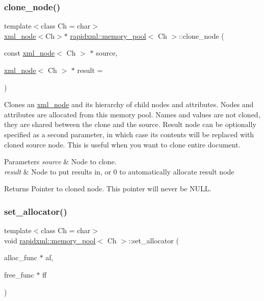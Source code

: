 \subsubsection{\texorpdfstring{clone\+\_\+node()}{clone\_node()}}
{\footnotesize\ttfamily template$<$class Ch  = char$>$ \\
\mbox{\hyperlink{classrapidxml_1_1xml__node}{xml\+\_\+node}}$<$Ch$>$$\ast$ \mbox{\hyperlink{classrapidxml_1_1memory__pool}{rapidxml\+::memory\+\_\+pool}}$<$ Ch $>$\+::clone\+\_\+node (\begin{DoxyParamCaption}\item[{const \mbox{\hyperlink{classrapidxml_1_1xml__node}{xml\+\_\+node}}$<$ Ch $>$ $\ast$}]{source,  }\item[{\mbox{\hyperlink{classrapidxml_1_1xml__node}{xml\+\_\+node}}$<$ Ch $>$ $\ast$}]{result = {} }\end{DoxyParamCaption})\hspace{0.3cm}{\ttfamily [inline]}}

Clones an \mbox{\hyperlink{classrapidxml_1_1xml__node}{xml\+\_\+node}} and its hierarchy of child nodes and attributes. Nodes and attributes are allocated from this memory pool. Names and values are not cloned, they are shared between the clone and the source. Result node can be optionally specified as a second parameter, in which case its contents will be replaced with cloned source node. This is useful when you want to clone entire document. 
\begin{DoxyParams}{Parameters}
{\em source} & Node to clone. \\
\hline
{\em result} & Node to put results in, or 0 to automatically allocate result node \\
\hline
\end{DoxyParams}
\begin{DoxyReturn}{Returns}
Pointer to cloned node. This pointer will never be N\+U\+LL. 
\end{DoxyReturn}
\mbox{\label{classrapidxml_1_1memory__pool_a84d3d8d2cdfc00501e1dcf26d889ae03}} 
\subsubsection{\texorpdfstring{set\+\_\+allocator()}{set\_allocator()}}
{\footnotesize\ttfamily template$<$class Ch  = char$>$ \\
void \mbox{\hyperlink{classrapidxml_1_1memory__pool}{rapidxml\+::memory\+\_\+pool}}$<$ Ch $>$\+::set\+\_\+allocator (\begin{DoxyParamCaption}\item[{alloc\+\_\+func $\ast$}]{af,  }\item[{free\+\_\+func $\ast$}]{ff }\end{DoxyParamCaption})\hspace{0.3cm}{\ttfamily [inline]}}

